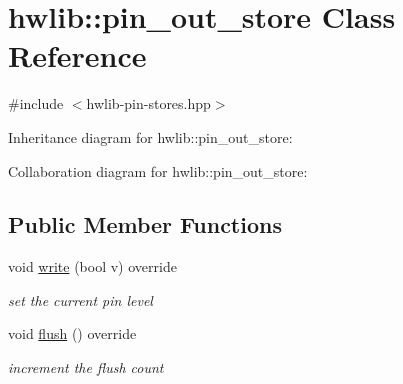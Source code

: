 \hypertarget{classhwlib_1_1pin__out__store}{}\section{hwlib\+:\+:pin\+\_\+out\+\_\+store Class Reference}
\label{classhwlib_1_1pin__out__store}


{\ttfamily \#include $<$hwlib-\/pin-\/stores.\+hpp$>$}



Inheritance diagram for hwlib\+:\+:pin\+\_\+out\+\_\+store\+:


Collaboration diagram for hwlib\+:\+:pin\+\_\+out\+\_\+store\+:
\subsection*{Public Member Functions}
\begin{DoxyCompactItemize}
\item 
\mbox{\label{classhwlib_1_1pin__out__store_a9ac425ba85709b5c1095e90a94445c77}} 
void \hyperlink{classhwlib_1_1pin__out__store_a9ac425ba85709b5c1095e90a94445c77}{write} (bool v) override
\begin{DoxyCompactList}\small\item\em set the current pin level \end{DoxyCompactList}\item 
\mbox{\label{classhwlib_1_1pin__out__store_a795292c741832d0cedb63b9333ef224f}} 
void \hyperlink{classhwlib_1_1pin__out__store_a795292c741832d0cedb63b9333ef224f}{flush} () override
\begin{DoxyCompactList}\small\item\em increment the flush count \end{DoxyCompactList}\end{DoxyCompactItemize}
